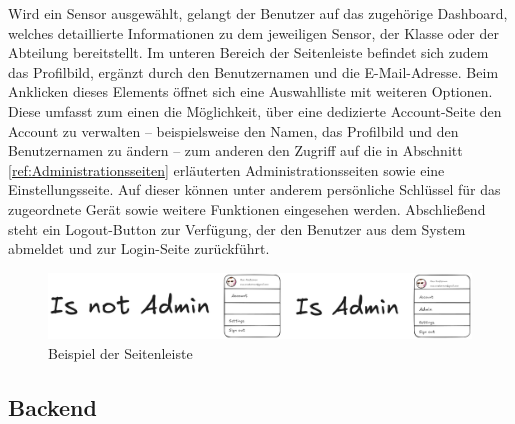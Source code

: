 \begin{inhalt}
Wird ein Sensor ausgewählt, gelangt der Benutzer auf das zugehörige Dashboard, welches detaillierte Informationen zu dem jeweiligen Sensor, der Klasse oder der Abteilung bereitstellt. Im unteren Bereich der Seitenleiste befindet sich zudem das Profilbild, ergänzt durch den Benutzernamen und die E-Mail-Adresse. Beim Anklicken dieses Elements öffnet sich eine Auswahlliste mit weiteren Optionen. Diese umfasst zum einen die Möglichkeit, über eine dedizierte Account-Seite den Account zu verwalten – beispielsweise den Namen, das Profilbild und den Benutzernamen zu ändern – zum anderen den Zugriff auf die in Abschnitt \ref{ref:Administrationsseiten} erläuterten Administrationsseiten sowie eine Einstellungsseite. Auf dieser können unter anderem persönliche Schlüssel für das zugeordnete Gerät sowie weitere Funktionen eingesehen werden. Abschließend steht ein Logout-Button zur Verfügung, der den Benutzer aus dem System abmeldet und zur Login-Seite zurückführt.

\begin{figure}[!htb] 
\centering 
\includegraphics[width=1\textwidth]{files/Thomas/pics/Design-Grundlagen/Frontend/Sidebar/sidebar-nav-user-adminvsnotadmin.png} 
\caption[Bildbezeichnung für Abbildungsverzeichnis]{Beispiel der Seitenleiste} 
\label{fig:gehaeuse_internet_bild} 
\end{figure}

\newpage

































\subsection{Backend}


\end{inhalt}
